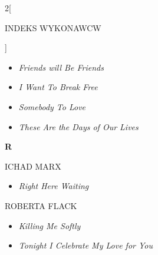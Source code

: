 \documentclass[a4paper]{report}
\begin{document}
\begin{multicols*}{2}[\begin{Huge}INDEKS WYKONAWCW\end{Huge}\vspace{1cm}]
\begin{minipage}{\columnwidth}
\begin{itemize}[topsep=3pt, after=\vspace{1.5mm}]
	\end{itemize}
\end{minipage}
\begin{minipage}{\columnwidth}
	\begin{itemize}[topsep=3pt, after=\vspace{1.5mm}]
		\itemsep0em
		\item[]  \textit{Friends will Be Friends}  \\
	\end{itemize}
\end{minipage}
\begin{minipage}{\columnwidth}
	\begin{itemize}[topsep=3pt, after=\vspace{1.5mm}]
		\itemsep0em
		\item[]  \textit{I Want To Break Free}  \\
	\end{itemize}
\end{minipage}
\begin{minipage}{\columnwidth}
	\begin{itemize}[topsep=3pt, after=\vspace{3mm}]
		\itemsep0em
		\item[]  \textit{Somebody To Love}  \\
		\item[]  \textit{These Are the Days of Our Lives}  \\
	\end{itemize}
\end{minipage}
\begin{minipage}{\columnwidth}
	\begin{Large}\textbf{R}\end{Large}ICHAD MARX 
	\begin{itemize}[topsep=3pt, after=\vspace{3mm}]
		\itemsep0em
		\item[]\textit{Right Here Waiting}  \\
	\end{itemize}
\end{minipage}
\begin{minipage}{\columnwidth}
	ROBERTA FLACK 
	\begin{itemize}[topsep=3pt, after=\vspace{3mm}]
		\itemsep0em
		\item[]\textit{Killing Me Softly}  \\
		\item[]  \textit{Tonight I Celebrate My Love for You}  \\

\end{itemize}
\end{minipage}
\end{multicols*}
\end{document}

